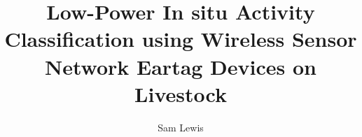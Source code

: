 \makeatletter
\title{Low-Power In situ Activity Classification using Wireless Sensor Network Eartag Devices on Livestock} \let\Title\@title
\author{Sam Lewis} \let\Author\@author
{}  %
\makeatother

\renewcommand{\degreetext}{in partial fulfilment of the Degree Bachelor of Engineering  \\ in the discipline of Electrical Engineering}

\titlepage





\tableofcontents
\listoffigures
\listoftables

